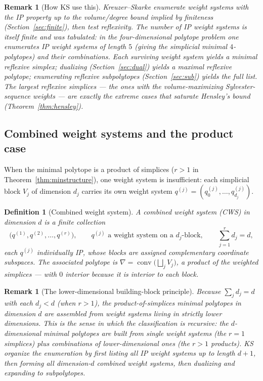 \documentclass{amsart}
\newtheorem{definition}[theorem]{Definition}
\newtheorem{remark}[theorem]{Remark}
\begin{document}
\begin{remark}[How KS use this]
Kreuzer--Skarke enumerate weight systems with the IP property up to the
volume/degree bound implied by finiteness (Section~\ref{sec:finite}), then
test reflexivity. The number of IP weight systems is itself finite and was
tabulated: in the four-dimensional polytope problem one enumerates IP
weight systems of length $5$ (giving the simplicial minimal $4$-polytopes)
and their combinations. Each surviving weight system yields a minimal
reflexive simplex; dualizing (Section~\ref{sec:dual}) yields a maximal
reflexive polytope; enumerating reflexive subpolytopes (Section~\ref{sec:sub})
yields the full list. The largest reflexive simplices --- the ones with the
volume-maximizing Sylvester-sequence weights --- are exactly the extreme
cases that saturate Hensley's bound (Theorem~\ref{thm:hensley}).
\end{remark}

\subsection{Combined weight systems and the product case}

When the minimal polytope is a product of simplices ($r>1$ in
Theorem~\ref{thm:minstructure}), one weight system is insufficient: each
simplicial block $V_j$ of dimension $d_j$ carries its own weight system
$q^{(j)}=(q^{(j)}_0,\dots,q^{(j)}_{d_j})$.

\begin{definition}[Combined weight system]\label{def:combined}
A \emph{combined weight system} (CWS) in dimension $d$ is a finite
collection
\begin{equation}
  \bigl(q^{(1)}, q^{(2)}, \dots, q^{(r)}\bigr),
  \qquad q^{(j)} \text{ a weight system on a } d_j\text{-block},
  \qquad \sum_{j=1}^{r} d_j = d,
\end{equation}
each $q^{(j)}$ individually IP, whose blocks are assigned complementary
coordinate subspaces. The associated polytope is
$\nabla = \operatorname{conv}\bigl(\bigsqcup_j V_j\bigr)$, a product of the
weighted simplices --- with $0$ interior because it is interior to each
block.
\end{definition}

\begin{remark}[The lower-dimensional building-block principle]
Because $\sum_j d_j = d$ with each $d_j < d$ (when $r>1$), the
product-of-simplices minimal polytopes in dimension $d$ are assembled from
weight systems living in \emph{strictly lower} dimensions. This is the sense
in which the classification is recursive: the $d$-dimensional minimal
polytopes are built from single weight systems (the $r=1$ simplices) plus
combinations of lower-dimensional ones (the $r>1$ products). KS organize the
enumeration by first listing all IP weight systems up to length $d+1$, then
forming all dimension-$d$ combined weight systems, then dualizing and
expanding to subpolytopes.
\end{remark}
\end{document}
